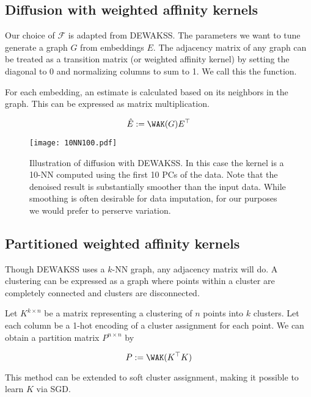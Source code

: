 \subsection{Diffusion with weighted affinity kernels}

Our choice of $\mathcal{F}$ is adapted from DEWAKSS\cite{tjarnberg2021}. The parameters we want to tune generate a graph $G$ from embeddings $E$. The adjacency matrix of any graph can be treated as a transition matrix (or weighted affinity kernel) by setting the diagonal to 0 and normalizing columns to sum to 1. We call this the \WAK function.



For each embedding, an estimate is calculated based on its neighbors in the graph. This can be expressed as matrix multiplication.

\begin{equation}
\hat{E} := \WAK(G)E^\top
\end{equation}



\begin{figure}
  \texttt{[image: 10NN100.pdf]}
  \caption{Illustration of diffusion with DEWAKSS. In this case the kernel is a 10-NN computed using the first 10 PCs of the data. Note that the denoised result is substantially smoother than the input data. While smoothing is often desirable for data imputation, for our purposes we would prefer to perserve variation.}
  \label{fig:}
\end{figure}

\subsection{Partitioned weighted affinity kernels} 

Though DEWAKSS uses a $k$-NN graph, any adjacency matrix will do.
A clustering can be expressed as a graph where points within a cluster are completely connected and clusters are disconnected.

Let $K^{k \times n}$ be a matrix representing a clustering of $n$ points into $k$ clusters. Let each column be a 1-hot encoding of a cluster assignment for each point. We can obtain a partition matrix $P^{n \times n}$ by

\begin{equation}
  P := \WAK(K^\top K)
\end{equation}

This method can be extended to soft cluster assignment, making it possible to learn $K$ via SGD.

